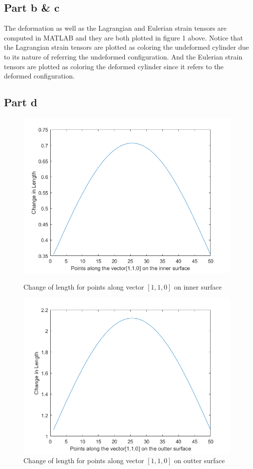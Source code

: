 \documentclass[a4paper,12pt]{article} %
\begin{document}
\subsection{Part b \& c}
The deformation as well as the Lagrangian and Eulerian strain tensors are computed in MATLAB and they are both plotted in figure 1 above.
Notice that the Lagrangian strain tensors are plotted as coloring the undeformed cylinder due to its nature of referring the undeformed configuration.
And the Eulerian strain tensors are plotted as coloring the deformed cylinder since it refers to the deformed configuration.

\subsection{Part d}
\begin{figure}[H]
    \includegraphics[scale=0.7]{MECH503HW1Q5_2.png}
    \caption{Change of length for points along vector $[1,1,0]$ on inner surface}
     
    \includegraphics[scale=0.7]{MECH503HW1Q5_3.png}
    \caption{Change of length for points along vector $[1,1,0]$ on outter surface}


\end{figure} 
\end{document}
